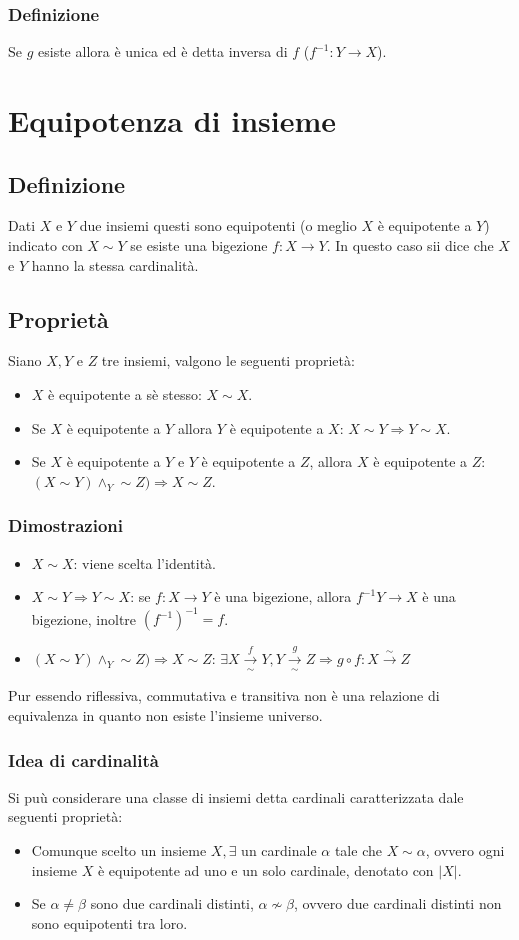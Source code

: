 \subsubsection{Definizione}
Se $g$ esiste allora \`e unica ed \`e detta inversa di $f$ ($f^{-1}:Y\rightarrow X$).
\section{Equipotenza di insieme}
\subsection{Definizione}
Dati $X$ e $Y$ due insiemi questi sono equipotenti (o meglio $X$ \`e equipotente a $Y$) indicato con $X\sim Y$ se esiste una bigezione $f:X\rightarrow Y$. In questo caso sii dice 
che $X$ e $Y$ hanno la stessa cardinalit\`a.
\subsection{Propriet\`a}
Siano $X,Y$ e $Z$ tre insiemi, valgono le seguenti propriet\`a:
\begin{itemize}
\item $X$ \`e equipotente a s\`e stesso: $X\sim X$.
\item Se $X$ \`e equipotente a $Y$ allora $Y$ \`e equipotente a $X$: $X\sim Y\Rightarrow Y\sim X$.
\item Se $X$ \`e equipotente a $Y$ e $Y$ \`e equipotente a $Z$, allora $X$ \`e equipotente a $Z$: $(X\sim Y)\wedge_Y\sim Z)\Rightarrow X\sim Z$. 
\end{itemize} 
\subsubsection{Dimostrazioni}
\begin{itemize}
\item $X\sim X$: viene scelta l'identit\`a.
\item $X\sim Y\Rightarrow Y\sim X$: se $f:X\rightarrow Y$ \`e una bigezione, allora $f^{-1}Y\rightarrow X$ \`e una bigezione, inoltre $(f^{-1})^{-1}=f$.
\item $(X\sim Y)\wedge_Y\sim Z)\Rightarrow X\sim Z$: $\exists X\xrightarrow[\sim]{f}Y, Y\xrightarrow[\sim]{g}Z\Rightarrow g\circ f:X\xrightarrow[]{\sim} Z$
\end{itemize}
Pur essendo riflessiva, commutativa e transitiva non \`e una relazione di equivalenza in quanto non esiste l'insieme universo.
\subsubsection{Idea di cardinalit\`a}
Si pu\`u considerare una classe di insiemi detta cardinali caratterizzata dale seguenti propriet\`a:
\begin{itemize}
\item Comunque scelto un insieme $X,\exists$ un cardinale $\alpha$ tale che $X\sim\alpha$, ovvero ogni insieme $X$ \`e equipotente ad uno e un solo cardinale, denotato con $|X|$.
\item Se $\alpha\neq\beta$ sono due cardinali distinti, $\alpha\not\sim\beta$, ovvero due cardinali distinti non sono equipotenti tra loro. 
\end{itemize} 
